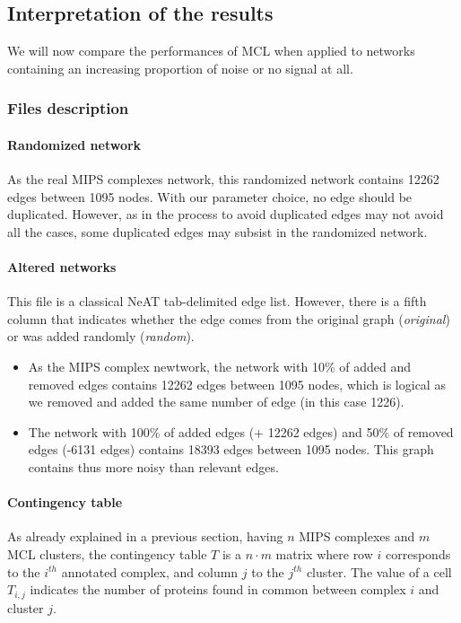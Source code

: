 \subsection{Interpretation of the results}

We will now compare the performances of MCL when applied to networks containing an increasing proportion of noise or no signal at all.

\subsubsection{Files description}

\paragraph{Randomized network}
As the real MIPS complexes network, this randomized network contains 12262 edges between 1095 nodes. With our parameter choice, no edge should be duplicated. However, as in  the process to avoid duplicated edges may not avoid all the cases, some duplicated edges may subsist in the randomized network. 

\paragraph{Altered networks}
  This file is a classical NeAT tab-delimited edge list. However, there is a fifth column that indicates
  whether the edge comes from the original graph (\textit{original}) or was added randomly (\textit{random}).
\begin{itemize}
 \item As the MIPS complex newtwork, the network with 10\% of added and removed edges contains 12262 edges between 1095 nodes, which is logical as we removed and added the same number of edge (in this case 1226).
 \item The network with 100\% of added edges (+ 12262 edges) and 50\% of removed edges (-6131 edges) contains 18393 edges between 1095 nodes. This graph contains thus more noisy than relevant edges.
\end{itemize}


\paragraph{Contingency table}
As already explained in a previous section, having $n$ MIPS complexes and $m$ MCL clusters, the contingency table $T$ is
a $n \cdot m$ matrix where row $i$ corresponds to the $i^{th}$
annotated complex, and column $j$ to the $j^{th}$ cluster. The value
of a cell $T_{i,j}$ indicates the number of proteins found in common
between complex $i$ and cluster $j$.

